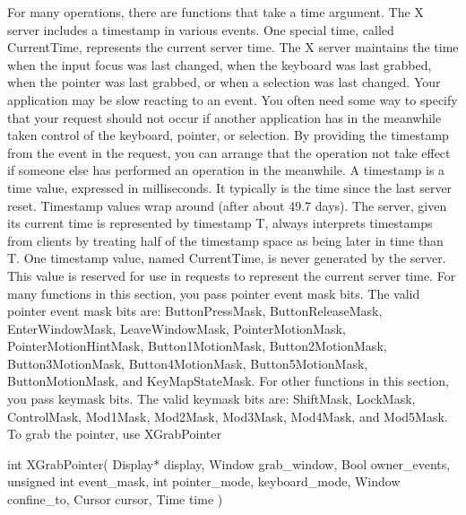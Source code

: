 \documentclass{report}
\begin{document}
\begin{itemize}
            \bigbreak \noindent 
            For many operations, there are functions that take a time argument. The X server includes a timestamp in various events. One special time, called CurrentTime, represents the current server time. The X server maintains the time when the input focus was last changed, when the keyboard was last grabbed, when the pointer was last grabbed, or when a selection was last changed. Your application may be slow reacting to an event. You often need some way to specify that your request should not occur if another application has in the meanwhile taken control of the keyboard, pointer, or selection. By providing the timestamp from the event in the request, you can arrange that the operation not take effect if someone else has performed an operation in the meanwhile.
            \bigbreak \noindent 
            A timestamp is a time value, expressed in milliseconds. It typically is the time since the last server reset. Timestamp values wrap around (after about 49.7 days). The server, given its current time is represented by timestamp T, always interprets timestamps from clients by treating half of the timestamp space as being later in time than T. One timestamp value, named CurrentTime, is never generated by the server. This value is reserved for use in requests to represent the current server time.
            \bigbreak \noindent 
            For many functions in this section, you pass pointer event mask bits. The valid pointer event mask bits are: ButtonPressMask, ButtonReleaseMask, EnterWindowMask, LeaveWindowMask, PointerMotionMask, PointerMotionHintMask, Button1MotionMask, Button2MotionMask, Button3MotionMask, Button4MotionMask, Button5MotionMask, ButtonMotionMask, and KeyMapStateMask. For other functions in this section, you pass keymask bits. The valid keymask bits are: ShiftMask, LockMask, ControlMask, Mod1Mask, Mod2Mask, Mod3Mask, Mod4Mask, and Mod5Mask.
            \bigbreak \noindent 
            To grab the pointer, use XGrabPointer
            \bigbreak \noindent 
            \begin{cppcode}
            int XGrabPointer(
                Display* display,
                Window grab_window,
                Bool owner_events,
                unsigned int event_mask,
                int pointer_mode, keyboard_mode,
                Window confine_to,
                Cursor cursor,
                Time time
            )
            \end{cppcode}
            \bigbreak \noindent
            \begin{itemize}

\end{itemize}
\end{itemize}
\end{document}
